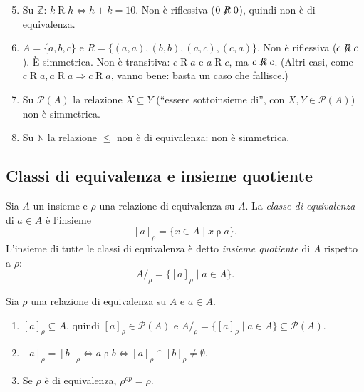 \documentclass[11pt,a4paper]{article}
\begin{document}
\begin{esempio}
\leavevmode
\begin{enumerate}
    \setcounter{enumi}{4}
    \item Su $\mathbb{Z}$: $k \mathrel{R} h \iff h + k = 10$. Non è
          riflessiva ($0 \not\mathrel{R} 0$), quindi non è di equivalenza.

    \item $A = \{a, b, c\}$ e $R = \{(a,a), (b,b), (a,c), (c,a)\}$.
          Non è riflessiva ($c \not\mathrel{R} c$). È simmetrica. Non è
          transitiva: $c \mathrel{R} a$ e $a \mathrel{R} c$, ma
          $c \not\mathrel{R} c$. (Altri casi, come
          $c \mathrel{R} a, a \mathrel{R} a \Rightarrow c \mathrel{R} a$,
          vanno bene: basta un caso che fallisce.)

    \item Su $\mathcal{P}(A)$ la relazione $X \subseteq Y$ (``essere
          sottoinsieme di'', con $X, Y \in \mathcal{P}(A)$) non è
          simmetrica.

    \item Su $\mathbb{N}$ la relazione $\leq$ non è di equivalenza: non è
          simmetrica.
\end{enumerate}
\end{esempio}

\subsection{Classi di equivalenza e insieme quotiente}

\begin{definizione}
Sia $A$ un insieme e $\rho$ una relazione di equivalenza su $A$. La
\emph{classe di equivalenza} di $a \in A$ è l'insieme
\[
[a]_\rho = \{x \in A \mid x \mathrel{\rho} a\}.
\]
L'insieme di tutte le classi di equivalenza è detto \emph{insieme
quotiente} di $A$ rispetto a $\rho$:
\[
A/_\rho = \{[a]_\rho \mid a \in A\}.
\]
\end{definizione}

\begin{osservazione}
Sia $\rho$ una relazione di equivalenza su $A$ e $a \in A$.
\begin{enumerate}
    \item $[a]_\rho \subseteq A$, quindi $[a]_\rho \in \mathcal{P}(A)$ e
          $A/_\rho = \{[a]_\rho \mid a \in A\} \subseteq \mathcal{P}(A)$.
    \item $[a]_\rho = [b]_\rho \iff a \mathrel{\rho} b \iff
          [a]_\rho \cap [b]_\rho \neq \emptyset$.
    \item Se $\rho$ è di equivalenza, $\rho^{op} = \rho$.
\end{enumerate}
\end{osservazione}
\end{document}
